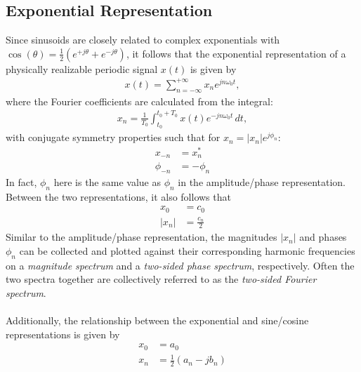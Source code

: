 \documentclass{report}
\begin{document}
\subsection{Exponential Representation}
Since sinusoids are closely related to complex exponentials with $\cos(\theta)=\frac{1}{2}(e^{+j\theta}+e^{-j\theta})$, it follows that the exponential representation of a physically realizable periodic signal $x(t)$ is given by 
\begin{align}
    x(t) = \sum_{n=-\infty}^{+\infty} x_n e^{jn\omega_0 t},
\end{align}
where the Fourier coefficients are calculated from the integral: 
\begin{align}
    x_n = \frac{1}{T_0} \int_{t_0}^{t_0+T_0} x(t) e^{-jn\omega_0 t} \,dt,
\end{align}
with conjugate symmetry properties such that for $x_n = |x_n|e^{j\phi_n}$:
\begin{align}
    x_{-n} &= x_n^* \\
    \phi_{-n} &= -\phi_n
\end{align}
In fact, $\phi_n$ here is the same value as $\phi_n$ in the amplitude/phase representation. Between the two representations, it also follows that 
\begin{align}
    x_0 &= c_0 \\
    |x_n| &= \frac{c_n}{2} 
\end{align} 
Similar to the amplitude/phase representation, the magnitudes $|x_n|$ and phases $\phi_n$ can be collected and plotted against their corresponding harmonic frequencies 
on a \emph{magnitude spectrum} and a \emph{two-sided phase spectrum}, respectively. Often the two spectra together are collectively referred to as the 
\emph{two-sided Fourier spectrum}. 
\\ \\
Additionally, the relationship between the exponential and sine/cosine representations is given by 
\begin{align}
    x_0 &= a_0 \\
    x_n &= \frac{1}{2}(a_n - jb_n)
\end{align}
\end{document}
